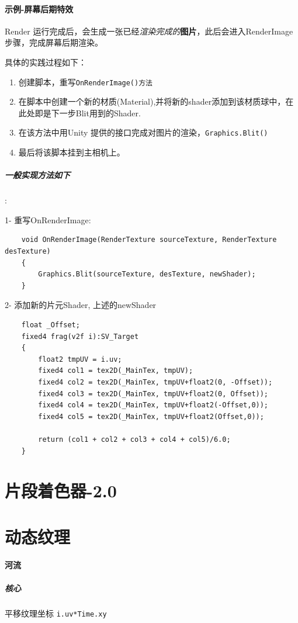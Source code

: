 \documentclass[UTF8,a4paper,12pt]{ctexbook}
\begin{document}
			
		\paragraph{示例-屏幕后期特效}
			Render 运行完成后，会生成一张已经\textit{渲染完成的}\textbf{图片}，此后会进入RenderImage 步骤，完成屏幕后期渲染。
			
			具体的实践过程如下：
				\begin{enumerate}[itemindent = 1em]
					\item 创建脚本，重写\verb|OnRenderImage()方法|
					\item 在脚本中创建一个新的材质(Material),并将新的shader添加到该材质球中，在此处即是下一步Blit用到的Shader.
					\item 在该方法中用Unity 提供的接口完成对图片的渲染，\verb|Graphics.Blit()|
					\item 最后将该脚本挂到主相机上。
				\end{enumerate}
		
			\subparagraph{一般实现方法如下}:
			
			1- 重写OnRenderImage:
			
			\begin{lstlisting}
	void OnRenderImage(RenderTexture sourceTexture, RenderTexture desTexture)
	{
		Graphics.Blit(sourceTexture, desTexture, newShader);
	}	
			\end{lstlisting}
		
			2- 添加新的片元Shader, 上述的newShader
			
			\begin{lstlisting}
	float _Offset;
	fixed4 frag(v2f i):SV_Target
	{
		float2 tmpUV = i.uv;
		fixed4 col1 = tex2D(_MainTex, tmpUV);
		fixed4 col2 = tex2D(_MainTex, tmpUV+float2(0, -Offset));
		fixed4 col3 = tex2D(_MainTex, tmpUV+float2(0, Offset));
		fixed4 col4 = tex2D(_MainTex, tmpUV+float2(-Offset,0));
		fixed4 col5 = tex2D(_MainTex, tmpUV+float2(Offset,0));
		
		return (col1 + col2 + col3 + col4 + col5)/6.0;
	}
			\end{lstlisting}
			
		
	\section{片段着色器-2.0 }
	
	\section{动态纹理}
	 \paragraph{河流}
		\subparagraph{核心}
			平移纹理坐标
			\verb|i.uv*Time.xy|
\end{document}
